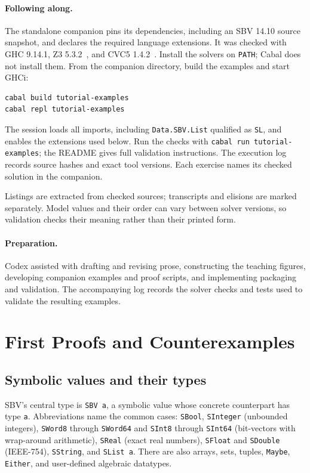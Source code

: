 \documentclass[acmsmall,screen,review,anonymous,nonacm]{acmart}
\newcommand{\code}[1]{\texttt{#1}}
\newcounter{exercise}
\begin{document}
\paragraph{Following along.}
The standalone companion pins its dependencies, including an SBV 14.10 source
snapshot, and declares the required language extensions. It was checked with
GHC 9.14.1, Z3 5.3.2~\citep{z3}, and CVC5 1.4.2~\citep{cvc5}.
Install the solvers on \code{PATH}; Cabal does not install them. From the
companion directory, build the examples and start GHCi:
\begin{lstlisting}[language={}]
cabal build tutorial-examples
cabal repl tutorial-examples
\end{lstlisting}
The session loads all imports, including \code{Data.SBV.List} qualified as
\code{SL}, and enables the extensions used below. Run the checks with
\code{cabal run tutorial-examples}; the README gives full validation instructions.
The execution log records source hashes and exact tool versions.
Each exercise names its checked solution in the companion.

Listings are extracted from checked sources; transcripts and elisions are marked
separately. Model values and their order can vary between solver versions, so
validation checks their meaning rather than their printed form.

\paragraph{Preparation.}
Codex assisted with drafting and revising prose, constructing the teaching
figures, developing companion examples and proof scripts, and implementing
packaging and validation. The accompanying log records the solver checks and
tests used to validate the resulting examples.

\section{First Proofs and Counterexamples}
\label{sec:first}

\subsection{Symbolic values and their types}

SBV's central type is \code{SBV a}, a symbolic value whose concrete counterpart
has type \code{a}. Abbreviations name the common cases: \code{SBool},
\code{SInteger} (unbounded integers), \code{SWord8} through \code{SWord64} and
\code{SInt8} through \code{SInt64} (bit-vectors with wrap-around arithmetic),
\code{SReal} (exact real numbers), \code{SFloat} and \code{SDouble} (IEEE-754),
\code{SString}, and \code{SList a}. There are also arrays, sets, tuples,
\code{Maybe}, \code{Either}, and user-defined algebraic datatypes.
\end{document}
